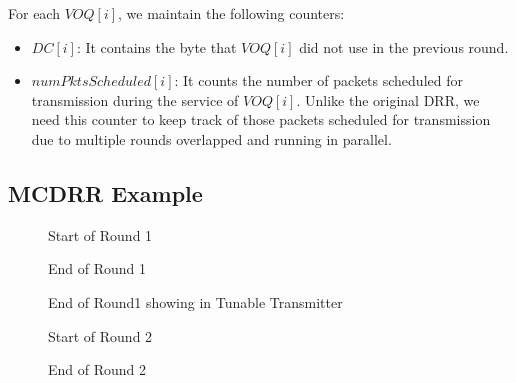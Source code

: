 \documentclass[conference,letterpaper]{IEEEtran}
\begin{document}
For each $VOQ[i]$, we maintain the following counters:
\begin{itemize}
\item $DC[i]$: It contains the byte that $VOQ[i]$ did not use in the previous
  round.
\item $numPktsScheduled[i]$: It counts the number of packets scheduled for
  transmission during the service of $VOQ[i]$. Unlike the original DRR, we need
  this counter to keep track of those packets scheduled for transmission due to
  multiple rounds overlapped and running in parallel.
\end{itemize}









\subsection{MCDRR Example}


\begin{figure}[hbtp]
\centering
{}
\caption{Start of Round 1}
\end{figure}



\begin{figure}[hbtp]
\centering
{}
\caption{End of Round 1}
\end{figure}

\begin{figure}[hbtp]
\centering
{}
\caption{End of Round1 showing in Tunable Transmitter}
\end{figure}

\begin{figure}[hbtp]
\centering
{}
\caption{Start of Round 2}
\end{figure}

\begin{figure}[hbtp]
\centering
{}
\caption{End of Round 2}
\end{figure}
\end{document}
